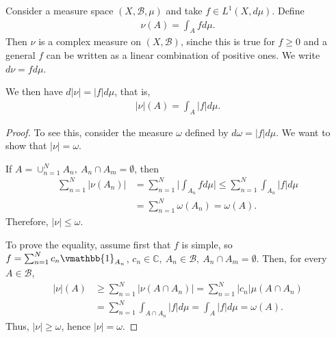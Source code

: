 \begin{example}
    Consider a measure space \((X,\mathscr{B},\mu)\) and take \(f\in L^1(X,d\mu)\). Define 
    \begin{align*}
        \nu(A) = \int_{A}fd\mu.
    \end{align*}
    Then \(\nu\) is a complex measure on \((X,\mathscr{B})\), sinche this is true for \(f\geq 0\) and a general \(f\) can be written as a linear combination of positive ones. We write \(d\nu = fd\mu\). 

    We then have \(d|\nu|=|f|d\mu\), that is,
    \begin{align*}
        |\nu|(A) = \int_{A}|f|d\mu.
    \end{align*}
\end{example}
\ifdetailed
\begin{proof}
    To see this, consider the measure \(\omega\) defined by \(d\omega = |f|d\mu\). We want to show that \(|\nu|=\omega\).

    If \(A=\cup_{n=1}^{N}A_n, \ A_n\cap A_m=\emptyset\), then
    \begin{align*}
        \sum\limits_{n=1}^{N} |\nu(A_n)| &= \sum\limits_{n=1}^{N}\Big\vert \int_{A_n}fd\mu\Big\vert \leq \sum\limits_{n=1}^{N}\int_{A_n}|f|d\mu \\
        &= \sum\limits_{n=1}^{N}\omega(A_n) = \omega(A). 
    \end{align*}
    Therefore, \(|\nu|\leq \omega\).

    To prove the equality, assume first that \(f\) is simple, so \(f=\sum_{n=1}^{N}c_n\vmathbb{1}_{A_n}\), \(c_n\in\mathbb{C}, \ A_n\in\mathscr{B}, \ A_n\cap A_m=\emptyset\). Then, for every \(A\in\mathscr{B}\),
    \begin{align*}
        |\nu|(A) &\geq \sum\limits_{n=1}^{N}|\nu\left(A\cap A_n\right)| = \sum\limits_{n=1}^{N}|c_n|\mu\left(A\cap A_n\right) \\
        &= \sum\limits_{n=1}^{N}\int_{A\cap A_n} |f|d\mu = \int_A |f|d\mu = \omega(A).
    \end{align*}
    Thus, \(|\nu|\geq \omega\), hence \(|\nu| = \omega\).


\end{proof}
